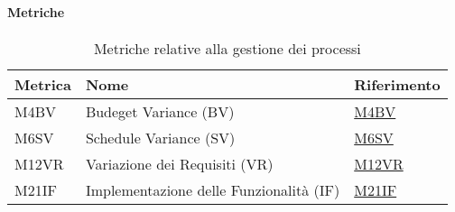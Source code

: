 \paragraph{Metriche}
\begin{table}[H]
  \centering
  \begin{tabular}{|C{3cm}|C{3cm}|C{4cm}|}
  \hline
  Metrica & Nome & Riferimento \\
  \hline \hline
  M4BV & Budeget Variance (BV) &  \hyperlink{item:M4BV}{M4BV} \\
  M6SV & Schedule Variance (SV) &  \hyperlink{item:M6SV}{M6SV} \\
  M12VR & Variazione dei Requisiti (VR) &  \hyperlink{item:M12VR}{M12VR} \\
  M21IF & Implementazione delle Funzionalità (IF) & \hyperlink{item:M21IF}{M21IF} \\ 
  \hline
  \end{tabular}
  \caption{Metriche relative alla gestione dei processi}
\end{table}

